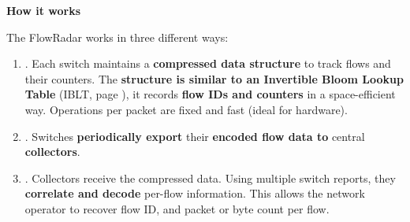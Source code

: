 \highspace
\begin{flushleft}
    \textcolor{Green3}{ \textbf{How it works}}
\end{flushleft}
The FlowRadar works in three different ways:
\begin{enumerate}
    \item {}. Each switch maintains a \textbf{compressed data structure} to track flows and their counters. The \textbf{structure is similar to an Invertible Bloom Lookup Table} (IBLT, page \pageref{subsubsection: Invertible Bloom Lookup Tables}), it records \textbf{flow IDs and counters} in a space-efficient way. Operations per packet are fixed and fast (ideal for hardware).
    
    \item {}. Switches \textbf{periodically export} their \textbf{encoded flow data to} central \textbf{collectors}.

    \item {}. Collectors receive the compressed data. Using multiple switch reports, they \textbf{correlate and decode} per-flow information. This allows the network operator to recover flow ID, and packet or byte count per flow.
\end{enumerate}